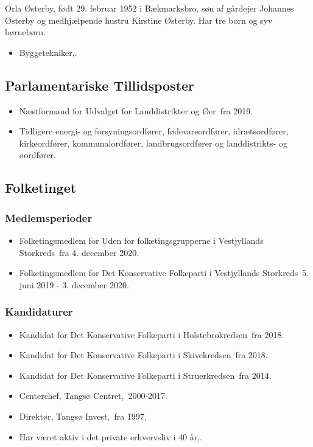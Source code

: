 \documentclass[11pt, a4paper]{awesome-cv}
\begin{document}
\makecvheader[R]
\makelettertitle
\begin{cvletter}
Orla Østerby, født 29. februar 1952 i Bækmarksbro, søn af gårdejer Johannes Østerby og medhjælpende hustru Kirstine Østerby. Har tre børn og syv børnebørn.

\begin{itemize}
\item Byggetekniker,.
\end{itemize}
\subsection*{Parlamentariske Tillidsposter}
\begin{itemize}
\item Næstformand for Udvalget for Landdistrikter og Øer fra 2019.
\item Tidligere energi- og forsyningsordfører, fødevareordfører, idrætsordfører, kirkeordfører, kommunalordfører, landbrugsordfører og landdistrikts- og øordfører.
\end{itemize}
\subsection*{Folketinget}
\subsubsection*{Medlemsperioder}
\begin{itemize}
\item Folketingsmedlem for Uden for folketingsgrupperne i Vestjyllands Storkreds fra 4. december 2020.
\item Folketingsmedlem for Det Konservative Folkeparti i Vestjyllands Storkreds 5. juni 2019 - 3. december 2020.
\end{itemize}
\subsubsection*{Kandidaturer}
\begin{itemize}
\item Kandidat for Det Konservative Folkeparti i Holstebrokredsen fra 2018.
\item Kandidat for Det Konservative Folkeparti i Skivekredsen fra 2018.
\item Kandidat for Det Konservative Folkeparti i Struerkredsen fra 2014.
\end{itemize}
\begin{itemize}
\item Centerchef, Tangsø Centret, 2000-2017.
\item Direktør, Tangsø Invest, fra 1997.
\item Har været aktiv i det private erhvervsliv i 40 år,.
\end{itemize}
\end{cvletter}
\end{document}
